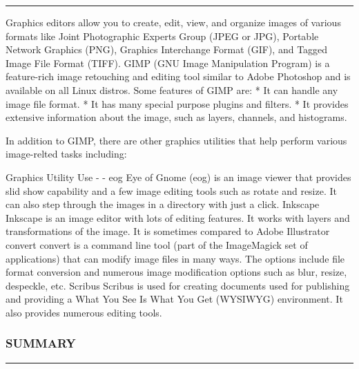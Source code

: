 \begin{center}\rule{3in}{0.4pt}\end{center}

Graphics editors allow you to create, edit, view, and organize images of
various formats like Joint Photographic Experts Group (JPEG or JPG),
Portable Network Graphics (PNG), Graphics Interchange Format (GIF), and
Tagged Image File Format (TIFF). GIMP (GNU Image Manipulation Program)
is a feature-rich image retouching and editing tool similar to Adobe
Photoshop and is available on all Linux distros. Some features of GIMP
are: * It can handle any image file format. * It has many special
purpose plugins and filters. * It provides extensive information about
the image, such as layers, channels, and histograms.

In addition to GIMP, there are other graphics utilities that help
perform various image-relted tasks including:

Graphics Utility \textbar{} Use - \textbar{} - eog \textbar{} Eye of
Gnome (eog) is an image viewer that provides slid show capability and a
few image editing tools such as rotate and resize. It can also step
through the images in a directory with just a click. Inkscape \textbar{}
Inkscape is an image editor with lots of editing features. It works with
layers and transformations of the image. It is sometimes compared to
Adobe Illustrator convert \textbar{} convert is a command line tool
(part of the ImageMagick set of applications) that can modify image
files in many ways. The options include file format conversion and
numerous image modification options such as blur, resize, despeckle,
etc. Scribus \textbar{} Scribus is used for creating documents used for
publishing and providing a What You See Is What You Get (WYSIWYG)
environment. It also provides numerous editing tools.

\subsubsection{SUMMARY}\label{summary-16}

\begin{center}\rule{3in}{0.4pt}\end{center}

